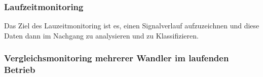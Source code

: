\subsubsection{Laufzeitmonitoring}

Das Ziel des Lauzeitmonitoring ist es, einen Signalverlauf aufzuzeichnen und diese Daten dann im Nachgang zu analysieren und zu Klassifizieren. 

\subsubsection{Vergleichsmonitoring mehrerer Wandler im laufenden Betrieb}